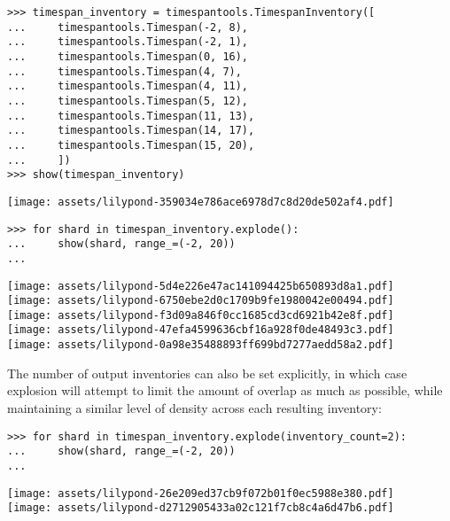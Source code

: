 \begin{singlespacing}
\vspace{-0.5\baselineskip}
\begin{lstlisting}
>>> timespan_inventory = timespantools.TimespanInventory([
...     timespantools.Timespan(-2, 8),
...     timespantools.Timespan(-2, 1),
...     timespantools.Timespan(0, 16),
...     timespantools.Timespan(4, 7),
...     timespantools.Timespan(4, 11),
...     timespantools.Timespan(5, 12),
...     timespantools.Timespan(11, 13),
...     timespantools.Timespan(14, 17),
...     timespantools.Timespan(15, 20),
...     ])
>>> show(timespan_inventory)
\end{lstlisting}
\noindent\texttt{[image: assets/lilypond-359034e786ace6978d7c8d20de502af4.pdf]}
\begin{lstlisting}
>>> for shard in timespan_inventory.explode():
...     show(shard, range_=(-2, 20))
...
\end{lstlisting}
\noindent\texttt{[image: assets/lilypond-5d4e226e47ac141094425b650893d8a1.pdf]}\\
\noindent\texttt{[image: assets/lilypond-6750ebe2d0c1709b9fe1980042e00494.pdf]}\\
\noindent\texttt{[image: assets/lilypond-f3d09a846f0cc1685cd3cd6921b42e8f.pdf]}\\
\noindent\texttt{[image: assets/lilypond-47efa4599636cbf16a928f0de48493c3.pdf]}\\
\noindent\texttt{[image: assets/lilypond-0a98e35488893ff699bd7277aedd58a2.pdf]}
\end{singlespacing}

\noindent The number of output inventories can also be set explicitly, in which
case explosion will attempt to limit the amount of overlap as much as possible,
while maintaining a similar level of density across each resulting inventory:

\begin{comment}
<abjad>
for shard in timespan_inventory.explode(inventory_count=2):
    show(shard, range_=(-2, 20))

</abjad>
\end{comment}

\begin{singlespacing}
\vspace{-0.5\baselineskip}
\begin{lstlisting}
>>> for shard in timespan_inventory.explode(inventory_count=2):
...     show(shard, range_=(-2, 20))
...
\end{lstlisting}
\noindent\texttt{[image: assets/lilypond-26e209ed37cb9f072b01f0ec5988e380.pdf]}\\
\noindent\texttt{[image: assets/lilypond-d2712905433a02c121f7cb8c4a6d47b6.pdf]}
\end{singlespacing}

